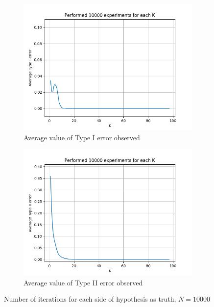 \documentclass[fleqn, 11pt]{article}
\begin{document}
\vspace{0pt}
\begin{figure}[H]
    \centering
    \begin{subfigure}[H]{0.49\textwidth}
        \centering
        \includegraphics[width=\textwidth]{P4/type1_10000.png}
        \caption[]{Average value of Type I error observed}
    \end{subfigure}
    \begin{subfigure}[H]{0.49\textwidth}
        \centering
        \includegraphics[width=\textwidth]{P4/type2_10000.png}
        \caption[]{Average value of Type II error observed}
    \end{subfigure}
    \caption{Number of iterations for each side of hypothesis as truth, $N = 10000$}
\end{figure}
\end{document}
